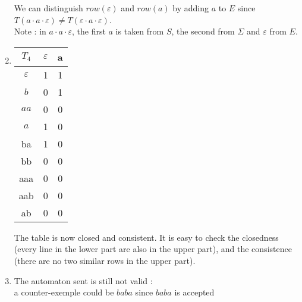\begin{enumerate}
\begin{center}
\begin{minipage}{0.5\textwidth}
            We can distinguish $row(\varepsilon)$ and $row(a)$ by adding $a$ to $E$ since $T(a \cdot a \cdot \varepsilon) \neq T(\varepsilon \cdot a \cdot \varepsilon)$. \\
            Note : in $a \cdot a \cdot \varepsilon$, the first $a$ is taken from $S$, the second from $\Sigma$ and $\varepsilon$ from $E$.
          \end{minipage}
        \end{center}
  \item  \quad
        \begin{center}
          \begin{tabular}{c || c | c }
            $T_4$         & $\varepsilon$ & a \\ [0.5ex]
            \hline\hline
            $\varepsilon$ & 1             & 1 \\
            $b$           & 0             & 1 \\
            $aa$          & 0             & 0 \\
            $a$           & 1             & 0 \\
            \hline \hline
            ba            & 1             & 0 \\
            bb            & 0             & 0 \\
            aaa           & 0             & 0 \\
            aab           & 0             & 0 \\
            ab            & 0             & 0 \\
          \end{tabular}
          \quad
          \begin{minipage}{0.5\textwidth}
            The table is now closed and consistent.
            It is easy to check the closedness (every line in the lower part are also in the upper part), and the consistence (there are no two similar rows in the upper part).
          \end{minipage}
        \end{center}
  \item \quad
        \begin{center}
          
          \quad
          \begin{minipage}{0.5\textwidth}
            The automaton sent is still not valid : \\
            a counter-exemple could be $baba$ since $baba$ is accepted \\

\end{minipage}
\end{center}
\end{enumerate}
